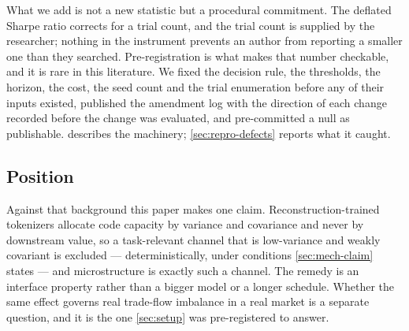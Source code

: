 What we add is not a new statistic but a procedural commitment. The deflated Sharpe ratio corrects
for a trial count, and the trial count is supplied by the researcher; nothing in the instrument
prevents an author from reporting a smaller one than they searched. Pre-registration is what makes
that number checkable, and it is rare in this literature. We fixed the decision rule, the
thresholds, the horizon, the cost, the seed count and the trial enumeration before any of their
inputs existed, published the amendment log with the direction of each change recorded before the
change was evaluated, and pre-committed a null as publishable.  describes the
machinery; \cref{sec:repro-defects} reports what it caught.

\subsection{Position}
\label{sec:rel-position}

Against that background this paper makes one claim. Reconstruction-trained tokenizers allocate
code capacity by variance and covariance and never by downstream value, so a task-relevant channel
that is low-variance and weakly covariant is excluded --- deterministically, under conditions
\cref{sec:mech-claim} states --- and microstructure is exactly such a channel. The remedy is an
interface property rather than a bigger model or a longer schedule. Whether the same effect governs
real trade-flow imbalance in a real market is a separate question, and it is the one
\cref{sec:setup} was pre-registered to answer.
